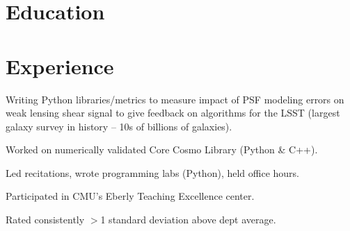 \documentclass[]{deedy-resume-openfont}
\begin{document}
\hfill
\begin{minipage}[t]{0.66\textwidth} 

\vfill\vfill
$\;$
\vfill


\section{\color{Blue} Education} 

 \hfill {}

\sectionsep

 \hfill {}
\sectionsep


\section{\color{Blue} Experience}

 \hfill {}

\begin{tightemize} \item Writing Python libraries/metrics to measure impact of PSF modeling errors on weak lensing shear signal to give feedback on algorithms for the LSST (largest galaxy survey in history -- 10s of billions of galaxies). \item Worked on numerically validated Core Cosmo Library (Python \& C++).
\end{tightemize}
\sectionsep



\begin{tightemize}\item Led recitations, wrote programming labs (Python), held office hours.
\item Participated in CMU's Eberly Teaching Excellence center. \item Rated consistently $>$1 standard deviation above dept average.
\end{tightemize}
\sectionsep


\end{minipage}
\end{document}
